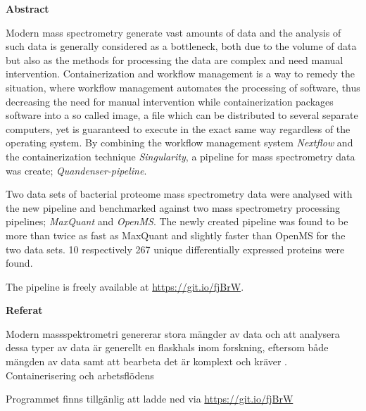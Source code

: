 \begin{center}\normalfont\Large\bfseries\centering Abstract\end{center}
Modern mass spectrometry generate vast amounts of data and the analysis of such data is generally considered as a bottleneck, both due to the volume of data but also as the methods for processing the data are complex and need manual intervention. Containerization and workflow management is a way to remedy the situation, where workflow management automates the processing of software, thus decreasing the need for manual intervention while containerization packages software into a so called image, a file which can be distributed to several separate computers, yet is guaranteed to execute in the exact same way regardless of the operating system. By combining the workflow management system \textit{Nextflow} and the containerization technique \textit{Singularity}, a pipeline for mass spectrometry data was create; \textit{Quandenser-pipeline}.

Two data sets of bacterial proteome mass spectrometry data were analysed with the new pipeline and benchmarked against two mass spectrometry processing pipelines; \textit{MaxQuant} and \textit{OpenMS}. The newly created pipeline was found to be more than twice as fast as MaxQuant and slightly faster than OpenMS for the two data sets. 10 respectively 267 unique differentially expressed proteins were found.

The pipeline is freely available at \url{https://git.io/fjBrW}.

\newpage

\begin{center}\normalfont\Large\bfseries\centering Referat\end{center}
Modern massspektrometri genererar stora mängder av data och att analysera dessa typer av data är generellt en flaskhals inom forskning, eftersom både mängden av data samt att bearbeta det är komplext och kräver . Containerisering och arbetsflödens

Programmet finns tillgänlig att ladde ned via \url{https://git.io/fjBrW}
